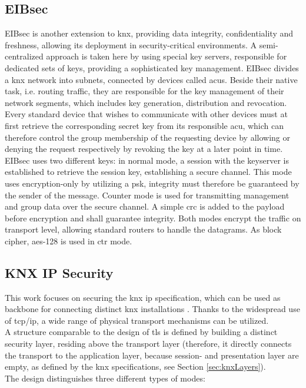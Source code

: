 \subsection{EIBsec}

EIBsec is another extension to \gls{knx}, providing data integrity, confidentiality and freshness, allowing its deployment in security-critical environments.
A semi-centralized approach is taken here by using special key servers, responsible for dedicated sets
of keys, providing a sophisticated key management. EIBsec divides a \gls{knx} network into subnets, connected by devices called \glspl{acu}. Beside their native
task, i.e. routing traffic, they
 are responsible for the key management of their network segments, which includes key generation, distribution and revocation. Every standard device that
 wishes to communicate with other devices must at first retrieve the corresponding secret key from its responsible \gls{acu}, which can therefore control the
 group membership of the requesting device by allowing or denying the request respectively by revoking the key at a later point in time.
\\
EIBsec uses two different keys: in normal mode, a session with the keyserver is established to retrieve the session key, establishing a secure channel.
This mode uses encryption-only by utilizing a \gls{psk}, integrity must therefore be guaranteed by the sender of the message. Counter mode is used for transmitting management and
group data over the secure channel. A simple \gls{crc} is added to the payload before encryption and shall guarantee integrity. Both modes encrypt the traffic
on transport level, allowing standard routers to handle the datagrams. As block cipher, \gls{aes}-128 is used in \gls{ctr} mode.

\subsection{KNX IP Security}

This work \cite{WG2009a} focuses on securing the \gls{knx} \gls{ip} specification, which can be used as backbone for connecting distinct \gls{knx} installations \cite{5195839}.
Thanks to the widespread use of \gls{tcp}/\gls{ip}, a wide range of physical transport mechanisms can be utilized.
\\
A structure comparable to the design of \gls{tls} is defined by building a distinct security layer, residing above the transport layer (therefore, it directly
connects the transport to the application layer, because session- and presentation layer are empty, as defined by the \gls{knx} specifications, see Section
\ref{sec:knxLayers}).
\\
The design distinguishes three different types of modes: 

